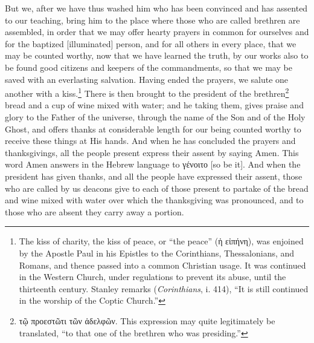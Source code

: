 But we, after we have thus washed him who has been convinced and has assented to our teaching, bring him to the place where those who are called brethren are assembled, in order that we may offer hearty prayers in common for ourselves and for the baptized [illuminated] person, and for all others in every place, that we may be counted worthy, now that we have learned the truth, by our works also to be found good citizens and keepers of the commandments, so that we may be saved with an everlasting salvation. Having ended the prayers, we salute one another with a kiss.\footnote{The kiss of charity, the kiss of peace, or “the peace” (\textgreek{ἡ εἰπήνη}), was enjoined by the Apostle Paul in his Epistles to the Corinthians, Thessalonians, and Romans, and thence passed into a common Christian usage. It was continued in the Western Church, under regulations to prevent its abuse, until the thirteenth century. Stanley remarks (\emph{Corinthians}, i. 414), “It is still continued in the worship of the Coptic Church.”} There is then brought to the president of the brethren\footnote{\textgreek{τῷ προεστῶτι τῶν ἀδελφῶν}. This expression may quite legitimately be translated, “to that one of the brethren who was presiding.”} bread and a cup of wine mixed with water; and he taking them, gives praise and glory to the Father of the universe, through the name of the Son and of the Holy Ghost, and offers thanks at considerable length for our being counted worthy to receive these things at His hands. And when he has concluded the prayers and thanksgivings, all the people present express their assent by saying Amen. This word Amen answers in the Hebrew language to \textgreek{γένοιτο} [so be it]. And when the president has given thanks, and all the people have expressed their assent, those who are called by us deacons give to each of those present to partake of the bread and wine mixed with water over which the thanksgiving was pronounced, and to those who are absent they carry away a portion.


